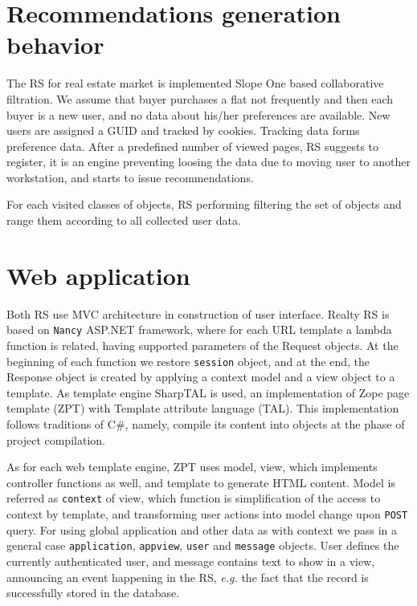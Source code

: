 \documentclass[conference]{IEEEtran}
\begin{document}
\section{Recommendations generation behavior}
\label{sec:proc-recs}

The RS for real estate market is implemented Slope One based collaborative filtration.  We assume that buyer purchases a flat not frequently and then each buyer is a new user, and no data about his/her preferences are available.  New users are assigned a GUID and tracked by cookies.  Tracking data forms preference data.  After a predefined number of viewed pages, RS suggests to register, it is an engine preventing loosing the data due to moving user to another workstation, and starts to issue recommendations.

For each visited classes of objects, RS performing filtering the set of objects and range them according to all collected user data.

\section{Web application}

Both RS use MVC architecture in construction of user interface.  Realty RS is based on \texttt{Nancy} ASP.NET framework, where for each URL template a lambda function is related, having supported parameters of the Request objects.  At the beginning of each function we restore \texttt{session} object, and at the end, the Response object is created by applying a context model and a view object to a template.  As template engine SharpTAL is used, an implementation of Zope page template (ZPT) with Template attribute language (TAL).  This implementation follows traditions of C\#, namely, compile its content into objects at the phase of project compilation.

As for each web template engine, ZPT uses model, view, which implements controller functions as well, and template to generate HTML content.  Model is referred as \texttt{context} of view, which function is simplification of the access to context by template, and transforming user actions into model change upon \texttt{POST} query.  For using global application and other data as with context we pass in a general case \texttt{application}, \texttt{appview}, \texttt{user} and \texttt{message} objects.  User defines the currently authenticated user, and message contains text to show in a view, announcing an event happening in the RS, \emph{e.g.} the fact that the record is successfully stored in the database.
\end{document}
